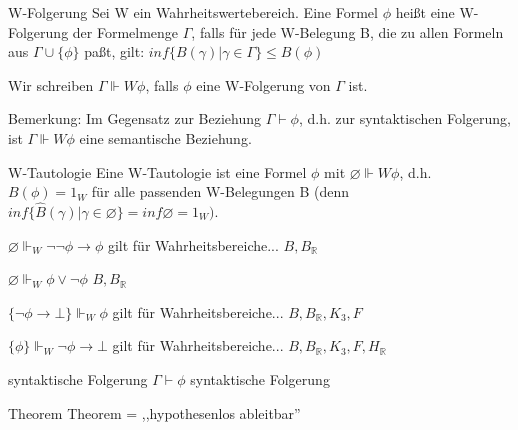 \documentclass[avery5371]{flashcards}
\begin{document}
\begin{flashcard}[ Wahrheitswertebereiche ]{ W-Folgerung }
    Sei W ein Wahrheitswertebereich.
    Eine Formel $\phi$ heißt eine W-Folgerung der Formelmenge $\Gamma$, falls für jede W-Belegung B, die zu allen Formeln aus $\Gamma \cup\{\phi\}$ paßt, gilt:
    $inf\{B(\gamma )|\gamma \in \Gamma \}\leq B(\phi)$

    Wir schreiben $\Gamma \Vdash W\phi$, falls $\phi$ eine W-Folgerung von $\Gamma$ ist.

    Bemerkung: Im Gegensatz zur Beziehung $\Gamma \vdash \phi$, d.h. zur syntaktischen Folgerung, ist $\Gamma \Vdash W \phi$ eine semantische Beziehung.
\end{flashcard}

\begin{flashcard}[ Wahrheitswertebereiche ]{ W-Tautologie }
    Eine W-Tautologie ist eine Formel $\phi$ mit $\varnothing \Vdash W\phi$, d.h. $B(\phi) = 1_W$ für alle passenden W-Belegungen B (denn $inf\{\hat{B}(\gamma )|\gamma \in \varnothing \}= inf \varnothing = 1_W)$.
\end{flashcard}

\begin{flashcard}[ Wahrheitswertebereiche ]{ $\varnothing\Vdash_W\lnot\lnot\phi\rightarrow\phi$ gilt für Wahrheitsbereiche... }
    $B, B_{\mathbb{R}}$
\end{flashcard}

\begin{flashcard}[ Wahrheitswertebereiche ]{ $\varnothing\Vdash_W\phi\vee\lnot\phi$  }
    $B, B_{\mathbb{R}}$
\end{flashcard}

\begin{flashcard}[ Wahrheitswertebereiche ]{ $\{\lnot\phi\rightarrow\bot\}\Vdash_W\phi$ gilt für Wahrheitsbereiche...  }
    $B, B_{\mathbb{R}}, K_3, F$
\end{flashcard}

\begin{flashcard}[ Wahrheitswertebereiche ]{ $\{\phi\}\Vdash_W\lnot\phi\rightarrow\bot$ gilt für Wahrheitsbereiche...  }
    $B, B_{\mathbb{R}}, K_3, F, H_{\mathbb{R}}$
\end{flashcard}

\begin{flashcard}[ Wahrheitswertebereiche ]{ syntaktische Folgerung }
    $\Gamma\vdash\phi$ syntaktische Folgerung
\end{flashcard}

\begin{flashcard}[ Wahrheitswertebereiche ]{ Theorem }
    Theorem = ,,hypothesenlos ableitbar''
\end{flashcard}
\end{document}
